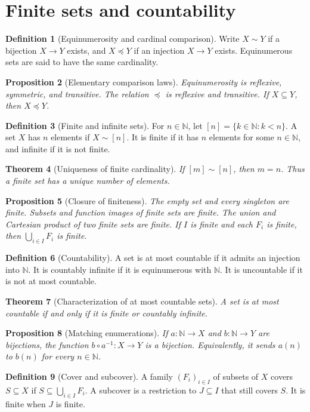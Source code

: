 \documentclass[11pt]{article}
\newtheorem{theorem}{Theorem}[section]
\newtheorem{proposition}[theorem]{Proposition}
\theoremstyle{definition}
\newtheorem{definition}[theorem]{Definition}
\newcommand{\N}{\mathbb N}
\begin{document}
\newpage
\section{Finite sets and countability}
\begin{definition}[Equinumerosity and cardinal comparison]
Write $X\sim Y$ if a bijection $X\to Y$ exists, and $X\preccurlyeq Y$
if an injection $X\to Y$ exists. Equinumerous sets are said to have
the same cardinality.
\end{definition}
\begin{proposition}[Elementary comparison laws]
Equinumerosity is reflexive, symmetric, and transitive.
The relation $\preccurlyeq$ is reflexive and transitive.
If $X\subseteq Y$, then $X\preccurlyeq Y$.
\end{proposition}
\begin{definition}[Finite and infinite sets]
For $n\in\N$, let $[n]=\{k\in\N:k<n\}$.
A set $X$ has $n$ elements if $X\sim[n]$. It is finite if it has
$n$ elements for some $n\in\N$, and infinite if it is not finite.
\end{definition}
\begin{theorem}[Uniqueness of finite cardinality]
If $[m]\sim[n]$, then $m=n$. Thus a finite set has a unique number of elements.
\end{theorem}
\begin{proposition}[Closure of finiteness]
The empty set and every singleton are finite. Subsets and function images
of finite sets are finite. The union and Cartesian product of two finite
sets are finite. If $I$ is finite and each $F_i$ is finite, then
$\bigcup_{i\in I}F_i$ is finite.
\end{proposition}
\begin{definition}[Countability]
A set is at most countable if it admits an injection into $\N$.
It is countably infinite if it is equinumerous with $\N$.
It is uncountable if it is not at most countable.
\end{definition}
\begin{theorem}[Characterization of at most countable sets]
A set is at most countable if and only if it is finite or countably infinite.
\end{theorem}
\begin{proposition}[Matching enumerations]
If $a:\N\to X$ and $b:\N\to Y$ are bijections, the function
$b\circ a^{-1}:X\to Y$ is a bijection. Equivalently, it sends $a(n)$
to $b(n)$ for every $n\in\N$.
\end{proposition}
\begin{definition}[Cover and subcover]
A family $(F_i)_{i\in I}$ of subsets of $X$ covers $S\subseteq X$ if
$S\subseteq\bigcup_{i\in I}F_i$. A subcover is a restriction to
$J\subseteq I$ that still covers $S$. It is finite when $J$ is finite.
\end{definition}
\end{document}
